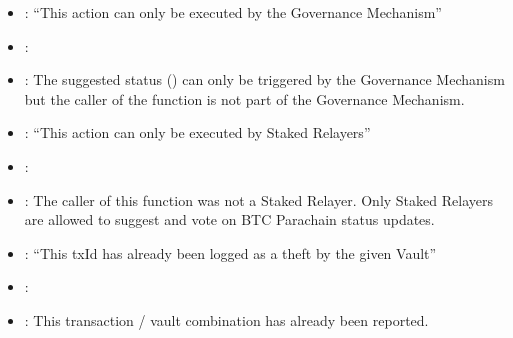 \documentclass[a4paper,10pt,english]{sphinxmanual}
\begin{document}
\begin{itemize}
\item {} 
: “This action can only be executed by the Governance Mechanism”

\item {} 
: {\hyperref[\detokenize{spec/staked-relayers:slashstakedrelayer}]{}}

\item {} 
: The suggested status () can only be triggered by the Governance Mechanism but the caller of the function is not part of the Governance Mechanism.

\end{itemize}

\begin{itemize}
\item {} 
: “This action can only be executed by Staked Relayers”

\item {} 
: {\hyperref[\detokenize{spec/staked-relayers:reportvaulttheft}]{}}

\item {} 
: The caller of this function was not a Staked Relayer. Only Staked Relayers are allowed to suggest and vote on BTC Parachain status updates.

\end{itemize}

\begin{itemize}
\item {} 
: “This txId has already been logged as a theft by the given Vault”

\item {} 
: {\hyperref[\detokenize{spec/staked-relayers:reportvaulttheft}]{}}

\item {} 
: This transaction / vault combination has already been reported.

\end{itemize}
\end{document}
